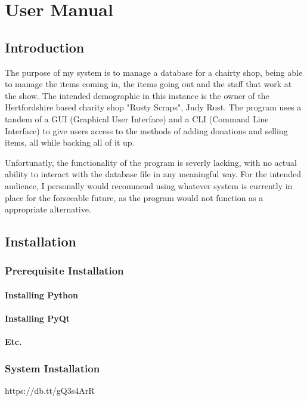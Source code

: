 \chapter{User Manual}

\section{Introduction}
The purpose of my system is to manage a database for a chairty shop, being able to manage the items coming in, the items going out and the staff that work at the show. The intended demographic in this instance is the owner of the Hertfordshire based charity shop "Rusty Scraps", Judy Rust. The program uses a tandem of a GUI (Graphical User Interface) and a CLI (Command Line Interface) to give users access to the methods of adding donations and selling items, all while backing all of it up.

Unfortunatly, the functionality of the program is severly lacking, with no actual ability to interact with the database file in any meaningful way. For the intended audience, I personally would recommend using whatever system is currently in place for the forseeable future, as the program would not function as a appropriate alternative.

\section{Installation}

\subsection{Prerequisite Installation}

\subsubsection{Installing Python}

\subsubsection{Installing PyQt}

\subsubsection{Etc.}

\subsection{System Installation}
https://db.tt/gQ3s4ArR
